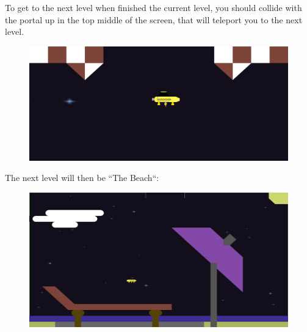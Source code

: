 \documentclass[../master.tex]{subfiles}
\begin{document}
To get to the next level when finished the current level, you should collide with the portal up in the top middle of the screen, that will teleport you to the next level.
\begin{figure}[h]
	\includegraphics[width=1\textwidth]{./Pictures/SpaceTaxiPortal2.png}
\end{figure}

The next level will then be ``The Beach``:
\begin{figure}[h]
	\includegraphics[width=1\textwidth]{./Pictures/TheBeach.png}
\end{figure}
\end{document}
